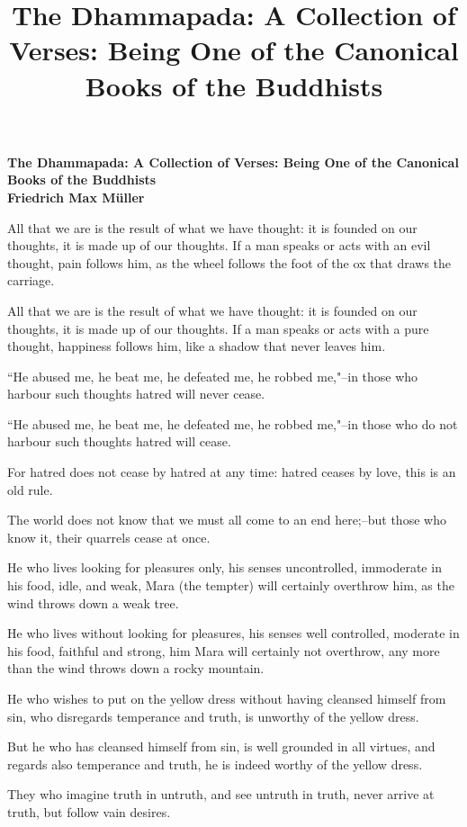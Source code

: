 \documentclass[12pt]{article}
\title{The Dhammapada: A Collection of Verses: Being One of the Canonical Books of the Buddhists}
\begin{document}
\thispagestyle{empty}
\begin{center}
\textbf{\Large The Dhammapada: A Collection of Verses: Being One of the Canonical Books of the Buddhists}\\
\textbf{Friedrich Max M\"{u}ller}\\

\end{center}

 All that we are is the result of what we have thought: it is 
founded on our thoughts, it is made up of our thoughts.  If a man
speaks or acts with an evil thought, pain follows him, as the wheel
follows the foot of the ox that draws the carriage.


 All that we are is the result of what we have thought: it is
founded on our thoughts, it is made up of our thoughts.  If a man
speaks or acts with a pure thought, happiness follows him, like a
shadow that never leaves him.


 ``He abused me, he beat me, he defeated me, he robbed me,"--in those
who harbour such thoughts hatred will never cease.


 ``He abused me, he beat me, he defeated me, he robbed me,"--in those
who do not harbour such thoughts hatred will cease.


 For hatred does not cease by hatred at any time: hatred ceases by
love, this is an old rule.


 The world does not know that we must all come to an end here;--but
those who know it, their quarrels cease at once.


 He who lives looking for pleasures only, his senses uncontrolled,
immoderate in his food, idle, and weak, Mara (the tempter) will
certainly overthrow him, as the wind throws down a weak tree.


 He who lives without looking for pleasures, his senses well
controlled, moderate in his food, faithful and strong, him Mara will
certainly not overthrow, any more than the wind throws down a rocky
mountain.


 He who wishes to put on the yellow dress without having cleansed
himself from sin, who disregards temperance and truth, is unworthy of
the yellow dress.


 But he who has cleansed himself from sin, is well grounded in all
virtues, and regards also temperance and truth, he is indeed worthy of
the yellow dress.


 They who imagine truth in untruth, and see untruth in truth, never
arrive at truth, but follow vain desires.
\end{document}
